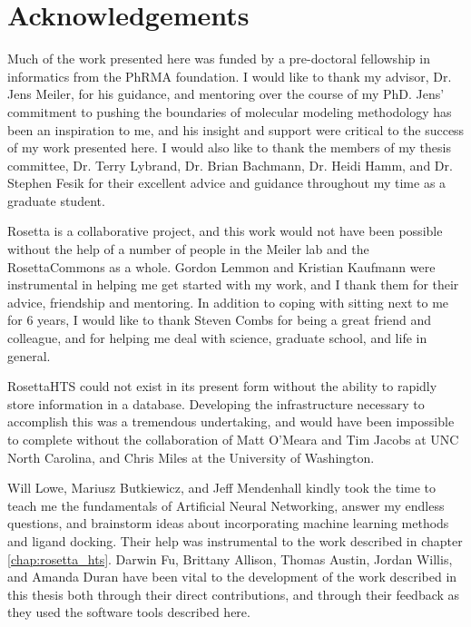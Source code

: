 \chapter*{Acknowledgements}
\vspace{7mm}

Much of the work presented here was funded by a pre-doctoral fellowship in informatics from the PhRMA foundation.
I would like to thank my advisor, Dr. Jens Meiler, for his guidance, and mentoring over the course of my PhD. Jens' commitment to pushing the boundaries of molecular modeling methodology has been an inspiration to me, and his insight and support were critical to the success of my work presented here. 
I would also like to thank the members of my thesis committee, Dr. Terry Lybrand, Dr. Brian Bachmann, Dr. Heidi Hamm, and Dr. Stephen Fesik for their excellent advice and guidance throughout my time as a graduate student. 

Rosetta is a collaborative project, and this work would not have been possible without the help of a number of people in the Meiler lab and the RosettaCommons as a whole.
Gordon Lemmon and Kristian Kaufmann were instrumental in helping me get started with my work, and I thank them for their advice, friendship and mentoring.
In addition to coping with sitting next to me for 6 years, I would like to thank Steven Combs for being a great friend and colleague, and for helping me deal with science, graduate school, and life in general.

RosettaHTS could not exist in its present form without the ability to rapidly store information in a database.
Developing the infrastructure necessary to accomplish this was a tremendous undertaking, and would have been impossible to complete without the collaboration of Matt O'Meara and Tim Jacobs at UNC North Carolina, and Chris Miles at the University of Washington.

Will Lowe, Mariusz Butkiewicz, and Jeff Mendenhall kindly took the time to teach me the fundamentals of Artificial Neural Networking, answer my endless questions, and brainstorm ideas about incorporating machine learning methods and ligand docking.
Their help was instrumental to the work described in chapter \ref{chap:rosetta_hts}.
Darwin Fu, Brittany Allison, Thomas Austin, Jordan Willis, and Amanda Duran have been vital to the development of the work described in this thesis both through their direct contributions, and through their feedback as they used the software tools described here.

